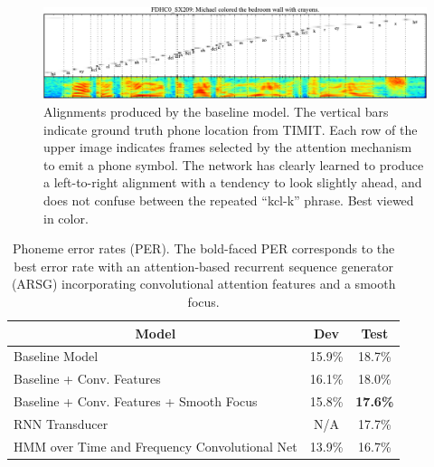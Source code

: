 \documentclass{article} %
\begin{document}
\begin{figure}[t]
  \centering
  \includegraphics[width=\textwidth]{michael_baseline}
  \caption[Alignments produced by the baseline]{Alignments
      produced by the baseline model. The vertical bars
      indicate ground truth phone location from TIMIT. Each
      row of the upper image indicates frames selected by
      the attention mechanism to emit a phone symbol. 
      The network has clearly learned to produce a left-to-right alignment with
      a tendency to look slightly ahead, and does not confuse between the
      repeated ``kcl-k'' phrase. 
      Best viewed in color.
  }  
  \label{fig:ali_baseline}

  \vspace{-4mm}
\end{figure}

\begin{table}[h]
    \caption{Phoneme error rates (PER). The bold-faced PER corresponds to the
    best error rate with an attention-based recurrent sequence generator (ARSG)
    incorporating convolutional attention features and a smooth focus. }
  \label{tab:results}
  \centering
\begin{tabular}{l|c|c}
  \multicolumn{1}{c|}{\bf Model}  &\multicolumn{1}{c|}{\bf Dev} &\multicolumn{1}{c}{\bf Test} \\ 
  \hline 
  \hline 
  Baseline Model & 15.9\% & 18.7\% \\
  Baseline + Conv. Features & 16.1\% & 18.0\% \\
  Baseline + Conv. Features + Smooth Focus & 15.8\% & {\bf 17.6\%} \\
  \hline
  RNN Transducer 
  \cite{graves_2013_timit} & N/A & 17.7\% \\
  \hline\hline
  HMM over Time and Frequency Convolutional Net
  \cite{toth_2014} & 13.9\% & 16.7\% 
  \end{tabular}

  \vspace{-4mm}
\end{table}
\end{document}
